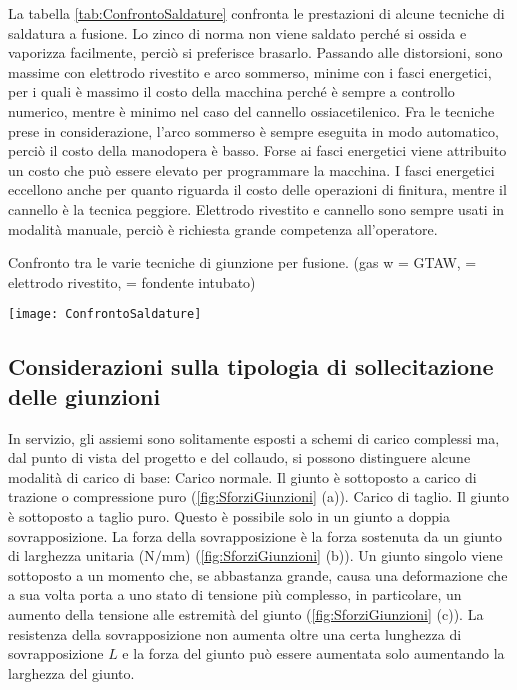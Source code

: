 La tabella \ref{tab:ConfrontoSaldature} confronta le prestazioni di alcune tecniche di saldatura a fusione. Lo zinco di norma non viene saldato perché si ossida e vaporizza facilmente, perciò si preferisce brasarlo. Passando alle distorsioni, sono massime con elettrodo rivestito e arco sommerso, minime con i fasci energetici, per i quali è massimo il costo della macchina perché è sempre a controllo numerico, mentre è minimo nel caso del cannello ossiacetilenico. Fra le tecniche prese in considerazione, l'arco sommerso è sempre eseguita in modo automatico, perciò il costo della manodopera è basso. Forse ai fasci energetici viene attribuito un costo che può essere elevato per programmare la macchina. I fasci energetici eccellono anche per quanto riguarda il costo delle operazioni di finitura, mentre il cannello è la tecnica peggiore. Elettrodo rivestito e cannello sono sempre usati in modalità manuale, perciò è richiesta grande competenza all'operatore.

\begin{table}
\centering
\caption{Confronto tra le varie tecniche di giunzione per fusione. (gas w = GTAW,  = elettrodo rivestito,  = fondente intubato)}
\label{tab:ConfrontoSaldature}
\texttt{[image: ConfrontoSaldature]}
\end{table}

\subsection{Considerazioni sulla tipologia di sollecitazione delle giunzioni}
In servizio, gli assiemi sono solitamente esposti a schemi di carico complessi ma, dal punto di vista del progetto e del collaudo, si possono distinguere alcune modalità di carico di base:
Carico normale. Il giunto è sottoposto a carico di trazione o compressione puro (\ref{fig:SforziGiunzioni} (a)).
Carico di taglio. Il giunto è sottoposto a taglio puro. Questo è possibile solo in un giunto a doppia sovrapposizione. La forza della sovrapposizione è la forza sostenuta da un giunto di larghezza unitaria ($\unit{\N/\mm}$) (\ref{fig:SforziGiunzioni} (b)).
Un giunto singolo viene sottoposto a un momento che, se abbastanza grande, causa una deformazione che a sua volta porta a uno stato di tensione più complesso, in particolare, un aumento della tensione alle estremità del giunto (\ref{fig:SforziGiunzioni} (c)).
La resistenza della sovrapposizione non aumenta oltre una certa lunghezza di sovrapposizione $L$ e la forza del giunto può essere aumentata solo aumentando la larghezza del giunto.

